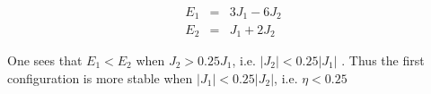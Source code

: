 \documentclass[english,12pt,a4,oneside]{report}
\begin{document}
\begin{eqnarray}
E_1&=&3J_1-6J_2\\
E_2&=&J_1+2J_2
\end{eqnarray}

One sees that $ E_1<E_2$ when $J_2>0.25J_1$,  i.e.  $|J_2|<0.25 |J_1| $ .
Thus the first configuration is more stable when $|J_1|<0.25 |J_2|$, i.e. $\eta <0.25$
\end{document}
